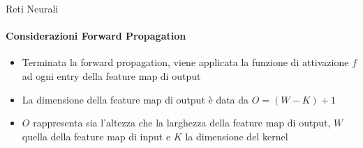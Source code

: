 \documentclass[
 ]{beamer}
\begin{document}

\begin{frame}{Reti Neurali}
    \framesubtitle{Considerazioni Forward Propagation} 
    
    \begin{itemize} [<+->]
        \setlength\itemsep{3em}
        \item \large Terminata la forward propagation, viene applicata la funzione di attivazione $f$ ad ogni entry della feature map di output
        \item \large La dimensione della feature map di output è data da $O = (W - K) + 1$
        \item \large $O$ rappresenta sia l'altezza che la larghezza della feature map di output, $W$ quella della feature map di input e $K$ la dimensione del kernel
    \end{itemize}
\end{frame}
\end{document}
